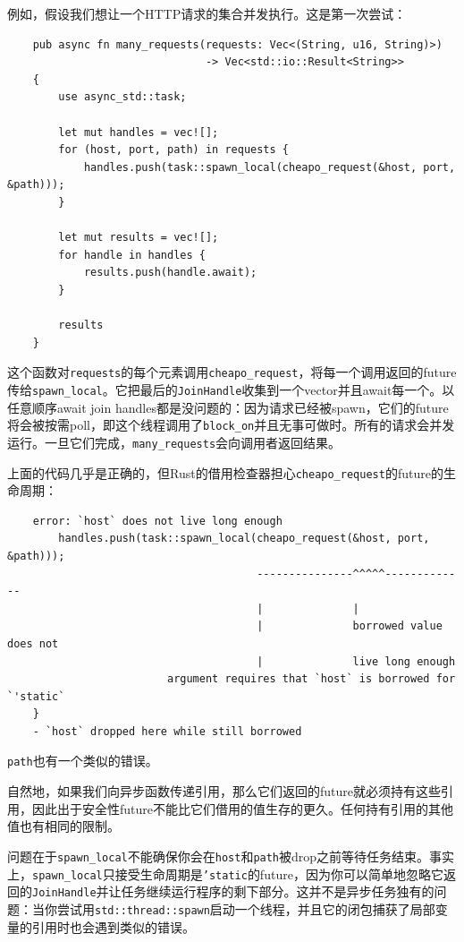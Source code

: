 例如，假设我们想让一个HTTP请求的集合并发执行。这是第一次尝试：
\begin{verbatim}
    pub async fn many_requests(requests: Vec<(String, u16, String)>)
                               -> Vec<std::io::Result<String>>
    {
        use async_std::task;

        let mut handles = vec![];
        for (host, port, path) in requests {
            handles.push(task::spawn_local(cheapo_request(&host, port, &path)));
        }

        let mut results = vec![];
        for handle in handles {
            results.push(handle.await);
        }

        results
    }
\end{verbatim}

这个函数对\texttt{requests}的每个元素调用\texttt{cheapo\_request}，将每一个调用返回的future传给\texttt{spawn\_local}。它把最后的\texttt{JoinHandle}收集到一个vector并且await每一个。以任意顺序await join handles都是没问题的：因为请求已经被spawn，它们的future将会被按需poll，即这个线程调用了\texttt{block\_on}并且无事可做时。所有的请求会并发运行。一旦它们完成，\texttt{many\_requests}会向调用者返回结果。

上面的代码几乎是正确的，但Rust的借用检查器担心\texttt{cheapo\_request}的future的生命周期：
\begin{verbatim}
    error: `host` does not live long enough
        handles.push(task::spawn_local(cheapo_request(&host, port, &path)));
                                       ---------------^^^^^-------------
                                       |              |
                                       |              borrowed value does not
                                       |              live long enough
                         argument requires that `host` is borrowed for `'static`
    }
    - `host` dropped here while still borrowed
\end{verbatim}

\texttt{path}也有一个类似的错误。

自然地，如果我们向异步函数传递引用，那么它们返回的future就必须持有这些引用，因此出于安全性future不能比它们借用的值生存的更久。任何持有引用的其他值也有相同的限制。

问题在于\texttt{spawn\_local}不能确保你会在\texttt{host}和\texttt{path}被drop之前等待任务结束。事实上，\texttt{spawn\_local}只接受生命周期是\texttt{'static}的future，因为你可以简单地忽略它返回的\texttt{JoinHandle}并让任务继续运行程序的剩下部分。这并不是异步任务独有的问题：当你尝试用\texttt{std::thread::spawn}启动一个线程，并且它的闭包捕获了局部变量的引用时也会遇到类似的错误。

